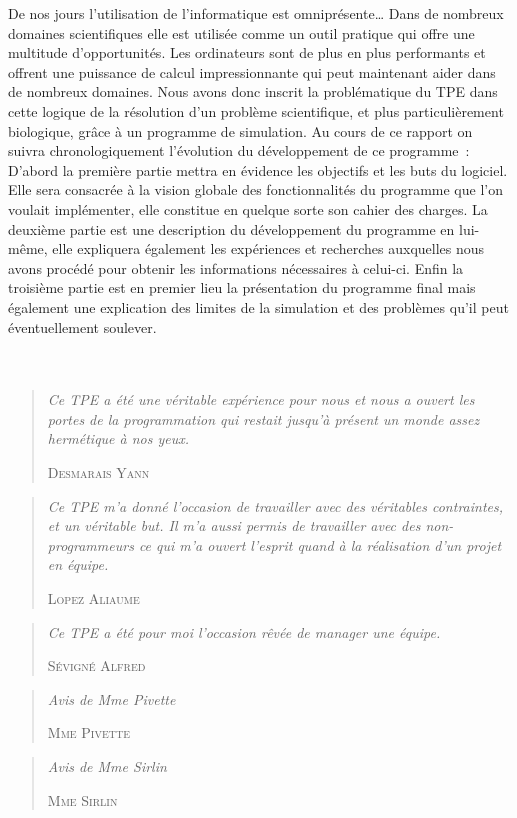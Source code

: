 
De nos jours l’utilisation de l’informatique est omniprésente… Dans de nombreux domaines scientifiques elle est utilisée comme un outil  pratique qui offre une multitude d’opportunités. Les ordinateurs sont de plus en plus performants et offrent une puissance de calcul impressionnante qui peut maintenant aider dans de nombreux domaines. Nous avons donc inscrit la problématique du TPE dans cette logique de la résolution d’un problème scientifique, et plus particulièrement biologique, grâce à un programme de simulation. Au cours de ce rapport on suivra chronologiquement l’évolution du développement de ce programme : D’abord la première partie mettra en évidence les objectifs et les buts du logiciel. Elle sera consacrée à la vision globale des fonctionnalités du programme que l’on voulait implémenter, elle constitue en quelque sorte son cahier des charges. La deuxième partie est une description du développement du programme en lui-même, elle expliquera également les expériences et recherches auxquelles nous avons procédé pour obtenir les informations nécessaires à celui-ci. Enfin la troisième partie est en premier lieu la présentation du programme final mais également une explication des limites de la simulation et des problèmes qu’il peut éventuellement soulever. \\ \\ \\

\begin{quotation}
  \textit{
    Ce TPE a été une véritable expérience pour nous et nous a ouvert les portes de la programmation qui restait jusqu'à présent un monde assez hermétique à nos yeux.
  }
  \begin{flushright}
    \textsc{Desmarais Yann}
  \end{flushright}
\end{quotation}

\begin{quotation}
  \textit{
    Ce TPE m'a donné l'occasion de travailler avec des véritables contraintes, et un véritable but.
    Il m'a aussi permis de travailler avec des non-programmeurs ce qui m'a ouvert l'esprit quand à la réalisation d'un projet en équipe.
  }
  \begin{flushright}
    \textsc{Lopez Aliaume}
  \end{flushright}
\end{quotation}

\begin{quotation}
  \textit{
    Ce TPE a été pour moi l'occasion rêvée de manager une équipe.
  }
  \begin{flushright}
    \textsc{Sévigné Alfred}
  \end{flushright}
\end{quotation}

\begin{quotation}
  \textit{
    Avis de Mme Pivette
  }
  \begin{flushright}
    \textsc{Mme Pivette}
  \end{flushright}
\end{quotation}

\begin{quotation}
  \textit{
    Avis de Mme Sirlin
  }
  \begin{flushright}
    \textsc{Mme Sirlin}
  \end{flushright}
\end{quotation}
